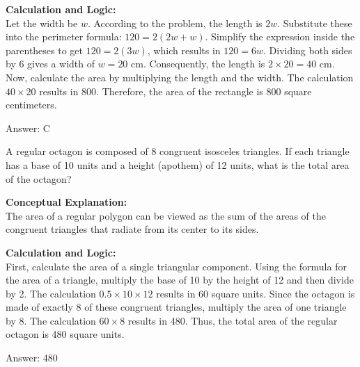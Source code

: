 \documentclass[11pt,paper=a4,answers]{exam}
\begin{document}
\begin{questions}
\begin{solution}
\vspace{30pt}

\textbf{Calculation and Logic:} \\
Let the width be $w$. According to the problem, the length is $2w$. Substitute these into the perimeter formula: $120 = 2(2w + w)$. Simplify the expression inside the parentheses to get $120 = 2(3w)$, which results in $120 = 6w$. Dividing both sides by 6 gives a width of $w = 20 \text{ cm}$. Consequently, the length is $2 \times 20 = 40 \text{ cm}$. Now, calculate the area by multiplying the length and the width. The calculation $40 \times 20$ results in 800. Therefore, the area of the rectangle is 800 square centimeters.

\vspace{30pt}

Answer: \colorbox{yellow!100}{C}
\end{solution}

\vspace{60pt}

\question
A regular octagon is composed of 8 congruent isosceles triangles. If each triangle has a base of 10 units and a height (apothem) of 12 units, what is the total area of the octagon?

\begin{solution}
\textbf{Conceptual Explanation:} \\
The area of a regular polygon can be viewed as the sum of the areas of the congruent triangles that radiate from its center to its sides.

\vspace{30pt}

\textbf{Calculation and Logic:} \\
First, calculate the area of a single triangular component. Using the formula for the area of a triangle, multiply the base of 10 by the height of 12 and then divide by 2. The calculation $0.5 \times 10 \times 12$ results in 60 square units. Since the octagon is made of exactly 8 of these congruent triangles, multiply the area of one triangle by 8. The calculation $60 \times 8$ results in 480. Thus, the total area of the regular octagon is 480 square units.

\vspace{30pt}

Answer: \colorbox{yellow!100}{480}
\end{solution}

\vspace{60pt}


\end{questions}
\end{document}
